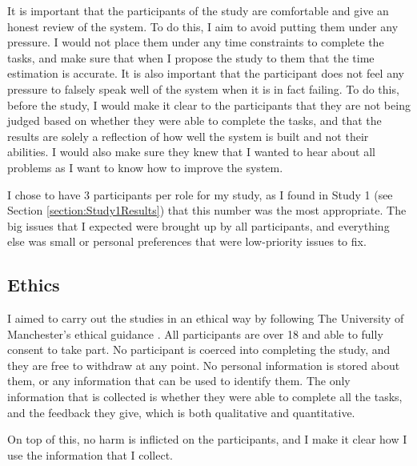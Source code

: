 It is important that the participants of the study are comfortable and give an honest review of the system. To do this, I aim to avoid putting them under any pressure. I would not place them under any time constraints to complete the tasks, and make sure that when I propose the study to them that the time estimation is accurate. It is also important that the participant does not feel any pressure to falsely speak well of the system when it is in fact failing. To do this, before the study, I would make it clear to the participants that they are not being judged based on whether they were able to complete the tasks, and that the results are solely a reflection of how well the system is built and not their abilities. I would also make sure they knew that I wanted to hear about all problems as I want to know how to improve the system.

I chose to have 3 participants per role for my study, as I found in Study 1 (see Section \ref{section:Study1Results}) that this number was the most appropriate. The big issues that I expected were brought up by all participants, and everything else was small or personal preferences that were low-priority issues to fix.

\subsection{Ethics}

I aimed to carry out the studies in an ethical way by following The University of Manchester's ethical guidance \cite{staffnet_2016}. All participants are over 18 and able to fully consent to take part. No participant is coerced into completing the study, and they are free to withdraw at any point. No personal information is stored about them, or any information that can be used to identify them. The only information that is collected is whether they were able to complete all the tasks, and the feedback they give, which is both qualitative and quantitative.

On top of this, no harm is inflicted on the participants, and I make it clear how I use the information that I collect. 

